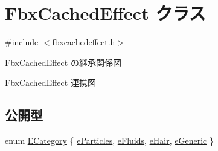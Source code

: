 \hypertarget{class_fbx_cached_effect}{}\section{Fbx\+Cached\+Effect クラス}
\label{class_fbx_cached_effect}


{\ttfamily \#include $<$fbxcachedeffect.\+h$>$}



Fbx\+Cached\+Effect の継承関係図


Fbx\+Cached\+Effect 連携図
\subsection*{公開型}
\begin{DoxyCompactItemize}
\item 
enum \hyperlink{class_fbx_cached_effect_ab402402f3e66d6e31eb3002b0bd58c33}{E\+Category} \{ \hyperlink{class_fbx_cached_effect_ab402402f3e66d6e31eb3002b0bd58c33a671d67cb2612c88c7845ded1a00a2354}{e\+Particles}, 
\hyperlink{class_fbx_cached_effect_ab402402f3e66d6e31eb3002b0bd58c33acafbbfe4981b823c92ea36406118dd98}{e\+Fluids}, 
\hyperlink{class_fbx_cached_effect_ab402402f3e66d6e31eb3002b0bd58c33aabf5b111f5d739c2f4b0aba73a87c18e}{e\+Hair}, 
\hyperlink{class_fbx_cached_effect_ab402402f3e66d6e31eb3002b0bd58c33a301e356a3faecf6bea31b2ab220b3cf8}{e\+Generic}
 \}
\end{DoxyCompactItemize}
